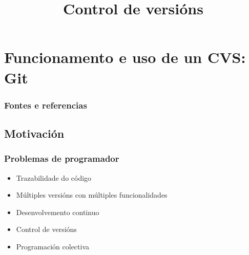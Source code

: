 

\title[CVS]{Control de versións}
\date{}
\author[Fran Rúa/Breixo Camiña]{}
\institute{}

\section{Funcionamento e uso de un CVS: Git}
\label{sec:Git}

\begin{frame}
  \titlepage
\end{frame}

\begin{frame}
  \frametitle{Fontes e referencias}
  
\end{frame}

\subsection{Motivación}
\label{subsec:motivacion}

\begin{frame}
  \frametitle{Problemas de programador}
  \begin{itemize}
    \item Trazabilidade do código
    \item Múltiples versións con múltiples funcionalidades
    \item Desenvolvemento continuo
    \item Control de versións
    \item Programación colectiva
  \end{itemize}
  
\end{frame}